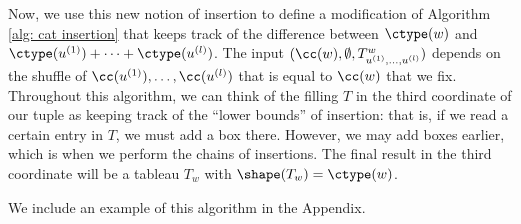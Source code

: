 Now, we use this new notion of insertion to define a modification of Algorithm \ref{alg: cat insertion} that keeps track of the difference between $\ctype(w)$ and $\ctype(u^{(1)})+ \cdots + \ctype(u^{(l)})$. 
The input $(\cc(w), \emptyset, T^w_{u^{(1)}, \dots, u^{(l)}})$ depends on the shuffle of $\cc(u^{(1)}),\dots, \cc( u^{(l)})$ that is equal to $\cc(w)$ that we fix. Throughout this algorithm, we can think of the filling $T$ in the third coordinate of our tuple as keeping track of the ``lower bounds'' of insertion: that is, if we read a certain entry in $T$, we must add a box there. However, we may add boxes earlier, which is when we perform the chains of insertions.  The final result in the third coordinate will be a tableau $T_w$ with $\shape(T_w) = \ctype(w)$.

We include an example of this algorithm in the Appendix. 


